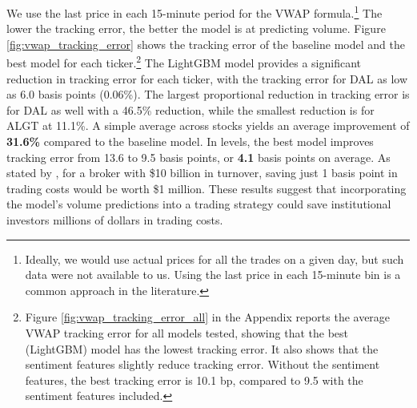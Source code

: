 \documentclass[12pt]{article}
\begin{document}
We use the last price in each 15-minute period for the VWAP formula.\footnote{Ideally, we would use actual prices for all the trades on a given day, but such data were not available to us. Using the last price in each 15-minute bin is a common approach in the literature.} The lower the tracking error, the better the model is at predicting volume. Figure \ref{fig:vwap_tracking_error} shows the tracking error of the baseline model and the best model for each ticker.\footnote{Figure \ref{fig:vwap_tracking_error_all} in the Appendix reports the average VWAP tracking error for all models tested, showing that the best (LightGBM) model has the lowest tracking error. It also shows that the sentiment features slightly reduce tracking error. Without the sentiment features, the best tracking error is 10.1 bp, compared to 9.5 with the sentiment features included.} The LightGBM model provides a significant reduction in tracking error for each ticker, with the tracking error for DAL as low as 6.0 basis points (0.06\%). The largest proportional reduction in tracking error is for DAL as well with a 46.5\% reduction, while the smallest reduction is for ALGT at 11.1\%. A simple average across stocks yields an average improvement of \textbf{31.6\%} compared to the baseline model. In levels, the best model improves tracking error from 13.6 to 9.5 basis points, or \textbf{4.1} basis points on average. As stated by \textcite{chen2016forecasting}, for a broker with \$10 billion in turnover, saving just 1 basis point in trading costs would be worth \$1 million. These results suggest that incorporating the model's volume predictions into a trading strategy could save institutional investors millions of dollars in trading costs.
\end{document}

